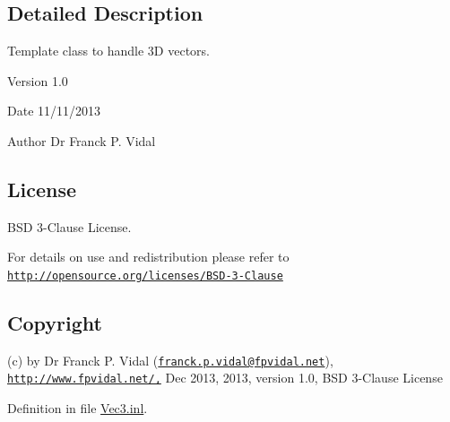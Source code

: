 \subsection{Detailed Description}
Template class to handle 3D vectors. \begin{DoxyVersion}{Version}
1.0
\end{DoxyVersion}
\begin{DoxyDate}{Date}
11/11/2013
\end{DoxyDate}
\begin{DoxyAuthor}{Author}
Dr Franck P. Vidal
\end{DoxyAuthor}
\hypertarget{_x_ray_renderer_8inl_License}{}\subsection{License}\label{_x_ray_renderer_8inl_License}
BSD 3-\/Clause License.

For details on use and redistribution please refer to \href{http://opensource.org/licenses/BSD-3-Clause}{\tt http://opensource.org/licenses/BSD-\/3-\/Clause}\hypertarget{_x_ray_renderer_8inl_Copyright}{}\subsection{Copyright}\label{_x_ray_renderer_8inl_Copyright}
(c) by Dr Franck P. Vidal (\href{mailto:franck.p.vidal@fpvidal.net}{\tt franck.p.vidal@fpvidal.net}), \href{http://www.fpvidal.net/,}{\tt http://www.fpvidal.net/,} Dec 2013, 2013, version 1.0, BSD 3-\/Clause License 

Definition in file \hyperlink{_vec3_8inl_source}{Vec3.inl}.

